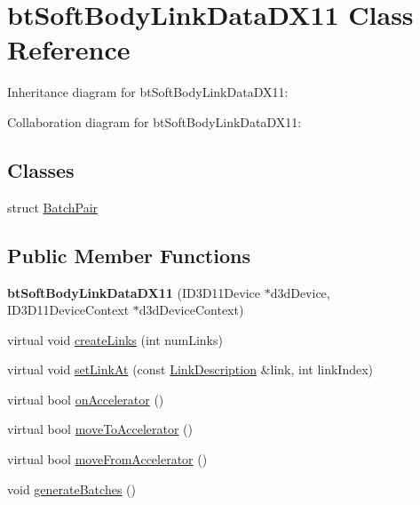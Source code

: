 \hypertarget{classbt_soft_body_link_data_d_x11}{\section{bt\+Soft\+Body\+Link\+Data\+D\+X11 Class Reference}
\label{classbt_soft_body_link_data_d_x11}
}


Inheritance diagram for bt\+Soft\+Body\+Link\+Data\+D\+X11\+:


Collaboration diagram for bt\+Soft\+Body\+Link\+Data\+D\+X11\+:
\subsection*{Classes}
\begin{DoxyCompactItemize}
\item 
struct \hyperlink{structbt_soft_body_link_data_d_x11_1_1_batch_pair}{Batch\+Pair}
\end{DoxyCompactItemize}
\subsection*{Public Member Functions}
\begin{DoxyCompactItemize}
\item 
\hypertarget{classbt_soft_body_link_data_d_x11_af003a11ce013c75e13426b326fcedc92}{{\bfseries bt\+Soft\+Body\+Link\+Data\+D\+X11} (I\+D3\+D11\+Device $\ast$d3d\+Device, I\+D3\+D11\+Device\+Context $\ast$d3d\+Device\+Context)}\label{classbt_soft_body_link_data_d_x11_af003a11ce013c75e13426b326fcedc92}

\item 
virtual void \hyperlink{classbt_soft_body_link_data_d_x11_a5844647a05674cc45bf99b658ba1804a}{create\+Links} (int num\+Links)
\item 
virtual void \hyperlink{classbt_soft_body_link_data_d_x11_a4ceea7a93543a6a54719e1d77c21cae1}{set\+Link\+At} (const \hyperlink{classbt_soft_body_link_data_1_1_link_description}{Link\+Description} \&link, int link\+Index)
\item 
virtual bool \hyperlink{classbt_soft_body_link_data_d_x11_a3138e6cb78bf8dac4786a3c45b26d5b8}{on\+Accelerator} ()
\item 
virtual bool \hyperlink{classbt_soft_body_link_data_d_x11_a6b08733c3c0216869e893779fb55d4c0}{move\+To\+Accelerator} ()
\item 
virtual bool \hyperlink{classbt_soft_body_link_data_d_x11_aad757252b4538a6f8f6eca526335e71d}{move\+From\+Accelerator} ()
\item 
void \hyperlink{classbt_soft_body_link_data_d_x11_ad19a5a48d1e5c611b5bbff496e8e591c}{generate\+Batches} ()
\end{DoxyCompactItemize}
